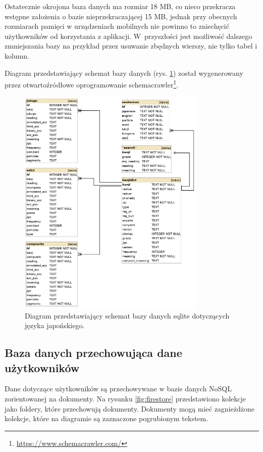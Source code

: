 \documentclass[a4paper,twoside,12pt]{book}
\begin{document}
Ostatecznie okrojona baza danych ma rozmiar 18 MB, co nieco przekracza wstępne założenia o bazie nieprzekraczającej 15 MB, jednak przy obecnych rozmiarach pamięci w urządzeniach mobilnych nie powinno to zniechęcić użytkowników od korzystania z aplikacji. W~przyszłości jest możliwość dalszego zmniejszania bazy na przykład przez usuwanie zbędnych wierszy, nie tylko tabel i kolumn.

Diagram przedstawiający schemat bazy danych (rys. \ref{fig:kanjidb}) został wygenerowany przez otwartoźródłowe oprogramowanie schemacrawler\footnote{\url{https://www.schemacrawler.com/}}.
\begin{figure}[]
\centering
\includegraphics[width=0.8\textwidth]{kanjidbrelations}
\caption{Diagram przedstawiający schemat bazy danych sqlite dotyczących języka japońskiego.}
\label{fig:kanjidb}
\end{figure}

\subsection{Baza danych przechowująca dane użytkowników}
\label{sec:4}

Dane dotyczące użytkowników są przechowywane w bazie danych NoSQL zorientowanej na dokumenty. Na rysunku \ref{fig:firestore} przedstawiono kolekcje jako foldery, które przechowują dokumenty. Dokumenty mogą mieć zagnieżdżone kolekcje, które na diagramie są zaznaczone pogrubionym tekstem. 
\end{document}
